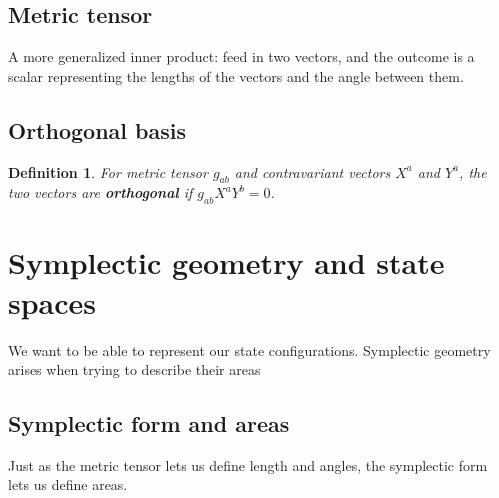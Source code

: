 \documentclass{book}
\newtheorem{defn}[equation]{Definition}
\begin{document}
\subsection{Metric tensor}
A more generalized inner product: feed in two vectors, and the outcome is a scalar representing the lengths of the vectors and the angle between them. 
\subsection{Orthogonal basis}

\begin{defn}
	For metric tensor $g_{ab}$ and contravariant vectors $X^a$ and $Y^a$, the two vectors are \textbf{orthogonal} if $g_{ab}X^aY^b = 0$. 
\end{defn}

\section{Symplectic geometry and state spaces}
We want to be able to represent our state configurations. Symplectic geometry arises when trying to describe their areas

\subsection{Symplectic form and areas}
Just as the metric tensor lets us define length and angles, the symplectic form lets us define areas. 
\end{document}
